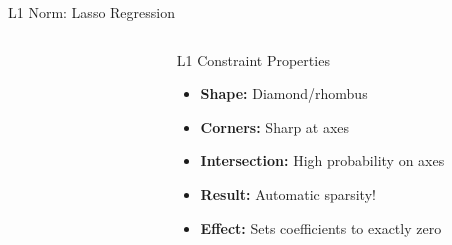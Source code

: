 \documentclass{beamer}
\begin{document}
\begin{frame}{L1 Norm: Lasso Regression}
\begin{columns}
\begin{column}{0.6\textwidth}
\begin{figure}
\end{figure}
\end{column}
\begin{column}{0.4\textwidth}
\begin{keypointsbox}{L1 Constraint Properties}
\begin{itemize}
\item \textbf{Shape:} Diamond/rhombus
\item \textbf{Corners:} Sharp at axes
\item \textbf{Intersection:} High probability on axes
\item \textbf{Result:} Automatic sparsity!
\item \textbf{Effect:} Sets coefficients to exactly zero
\end{itemize}
\end{keypointsbox}
\end{column}
\end{columns}
\end{frame}
\end{document}
